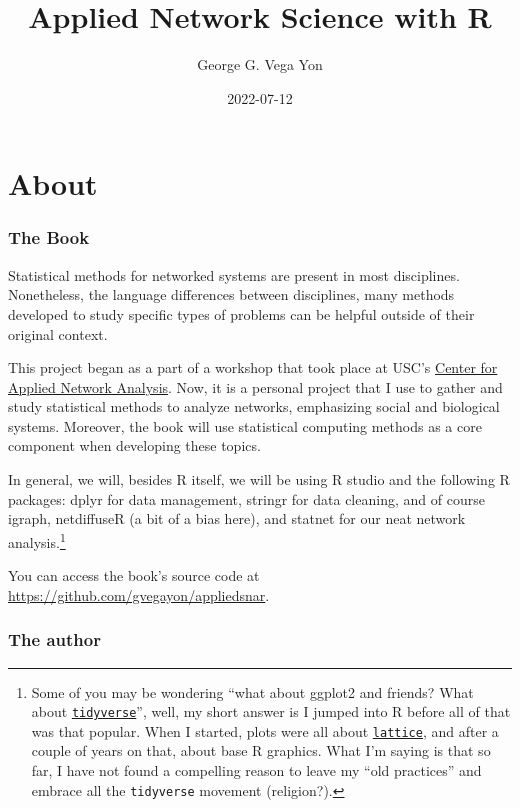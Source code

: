 \documentclass[]{book}
\title{Applied Network Science with R}
\author{George G. Vega Yon}
\date{2022-07-12}
\begin{document}
\maketitle

{
\setcounter{tocdepth}{1}
\tableofcontents
}
\hypertarget{about}{%
\chapter{About}\label{about}}

\renewcommand{\Pr}[1]{\mbox{Pr}\left(#1\right)}
\renewcommand{\exp}[1]{\mbox{exp}\left\{#1\right\}}

\hypertarget{the-book}{%
\subsection{The Book}\label{the-book}}

Statistical methods for networked systems are present in most disciplines.
Nonetheless, the language differences between disciplines, many methods
developed to study specific types of problems can be helpful outside of their original context.

This project began as a part of a workshop that took place at USC's
\href{https://cana.usc.edu}{Center for Applied Network Analysis}. Now, it is a personal
project that I use to gather and study statistical methods to analyze networks, emphasizing social and biological systems.
Moreover, the book will use statistical computing methods as a core component
when developing these topics.

In general, we will, besides R itself, we will be using R studio and the following
R packages: dplyr for data management, stringr for data cleaning, and of course
igraph, netdiffuseR (a bit of a bias here), and statnet for our neat network
analysis.\footnote{Some of you may be wondering ``what about ggplot2 and friends? What about \href{https://www.tidyverse.org/}{\texttt{tidyverse}}'', well, my short answer is I jumped into R before all of that was that popular. When I started, plots were all about \href{https://CRAN.R-project.org/package=lattice}{\texttt{lattice}}, and after a couple of years on that, about base R graphics. What I'm saying is that so far, I have not found a compelling reason to leave my ``old practices'' and embrace all the \texttt{tidyverse} movement (religion?).}

You can access the book's source code at \url{https://github.com/gvegayon/appliedsnar}.

\hypertarget{the-author}{%
\subsection{The author}\label{the-author}}
\end{document}
